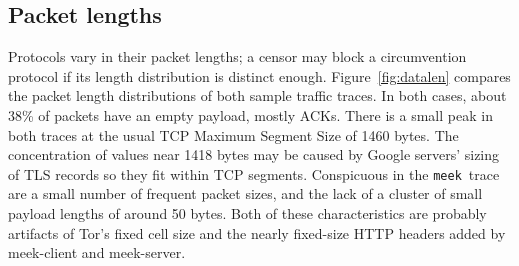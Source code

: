 \documentclass[conference]{IEEEtran}
\newcommand{\meekclient}{\mbox{meek-client}\xspace}
\newcommand{\meekserver}{\mbox{meek-server}\xspace}
\newcommand{\meek}{\texttt{meek}\xspace}
\begin{document}
\subsection{Packet lengths}

Protocols vary in their packet lengths;
a censor may block a circumvention protocol if its length distribution
is distinct enough.
Figure~\ref{fig:datalen}
compares the packet length distributions of both sample traffic traces.
In both cases, about 38\% of packets have an empty payload, mostly ACKs.
There is a small peak in both traces at the usual TCP Maximum Segment Size
of 1460 bytes.
The concentration of values near 1418 bytes
may be caused by Google servers' sizing of TLS records so they fit within TCP segments.
Conspicuous in the \meek\ trace are a small number of
frequent packet sizes,
and the lack of a cluster of small payload lengths of around 50 bytes.
Both of these characteristics are probably artifacts
of Tor's fixed cell size and the nearly fixed-size HTTP headers
added by \meekclient and \meekserver.

%

\end{document}
